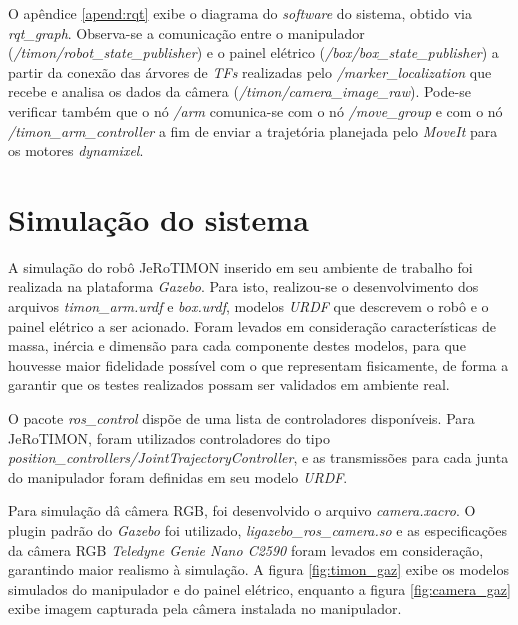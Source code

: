 O apêndice \ref{apend:rqt} exibe o diagrama do \textit{software} do sistema, obtido via \textit{rqt\_graph}. Observa-se a comunicação entre o manipulador (\textit{/timon/robot\_state\_publisher}) e o painel elétrico (\textit{/box/box\_state\_publisher}) a partir da conexão das árvores de \textit{TFs} realizadas pelo \textit{/marker\_localization} que recebe e analisa os dados da câmera (\textit{/timon/camera\_image\_raw}). Pode-se verificar também que o nó \textit{/arm} comunica-se com o nó \textit{/move\_group} e com o nó \textit{/timon\_arm\_controller} a fim de enviar a trajetória planejada pelo \textit{MoveIt} para os motores \textit{dynamixel}.





\section{Simulação do sistema}
\label{sec:simul}
A simulação do robô JeRoTIMON inserido em seu ambiente de trabalho foi realizada na plataforma \textit{Gazebo}. Para isto, realizou-se o desenvolvimento dos arquivos \textit{timon\_arm.urdf} e \textit{box.urdf}, modelos \textit{\acs{URDF}} que descrevem o robô e o painel elétrico a ser acionado. Foram levados em consideração características de massa, inércia e dimensão para cada componente destes modelos, para que houvesse maior fidelidade possível com o que representam fisicamente, de forma a garantir que os testes realizados possam ser validados em ambiente real. 

O pacote \textit{ros\_control} dispõe de uma lista de controladores disponíveis. Para JeRoTIMON, foram utilizados controladores do tipo \textit{position\_controllers/JointTrajectoryController}, e as transmissões para cada junta do manipulador foram definidas em seu modelo \textit{\acs{URDF}}.

Para simulação dâ câmera RGB, foi desenvolvido o arquivo \textit{camera.xacro}. O plugin padrão do \textit{Gazebo} foi utilizado, \textit{ligazebo\_ros\_camera.so} e as especificações da câmera RGB \textit{Teledyne Genie Nano C2590} foram levados em consideração, garantindo maior realismo à simulação. A figura \ref{fig:timon_gaz} exibe os modelos simulados do manipulador e do painel elétrico, enquanto a figura \ref{fig:camera_gaz} exibe imagem capturada pela câmera instalada no manipulador.


